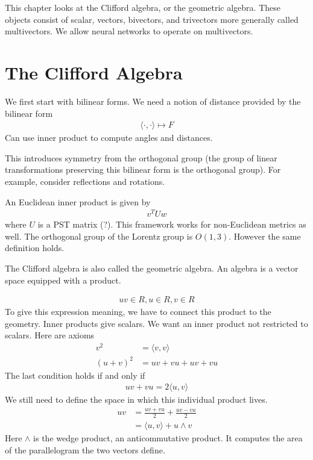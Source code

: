 \documentclass[book.tex]{subfiles}
\begin{document}
This chapter looks at the Clifford algebra, or the geometric algebra. These objects consist of scalar, vectors, bivectors, and trivectors more generally called multivectors. We allow neural networks to operate on multivectors.

\section{The Clifford Algebra}

We first start with bilinear forms. We need a notion of distance provided by the bilinear form
\begin{align}
    \langle \cdot, \cdot \rangle \mapsto F
\end{align}
Can use inner product to compute angles and distances.

This introduces symmetry from the orthogonal group (the group of linear transformations preserving this bilinear form is the orthogonal group). For example, consider reflections and rotations. 

An Euclidean inner product is given by
\begin{align}
    v^TUw
\end{align}
where $U$ is a PST matrix (?). This framework works for non-Euclidean metrics as well. The orthogonal group of the Lorentz group is $O(1, 3)$. However the same definition holds.

The Clifford algebra is also called the geometric algebra. An algebra is a vector space equipped with a product. 

\begin{align}
    uv \in R, u \in R, v \in R
\end{align}
To give this expression meaning, we have to connect this product to the geometry. Inner products give scalars. We want an inner product not restricted to scalars. Here are axioms
\begin{align}
    v^2 &= \langle v, v \rangle \\
    (u + v)^2 &= uv + vu + uv + vu 
\end{align}
The last condition holds if and only if
\begin{align}
    uv + vu = 2\langle u, v\rangle
\end{align}
We still need to define the space in which this individual product lives.
\begin{align}
    uv &= \frac{uv + vu}{2} + \frac{uv-vu}{2}  \\
    &= \langle u, v \rangle + u \wedge v
\end{align}
Here $\wedge$ is the wedge product, an anticommutative product. It computes the area of the parallelogram the two vectors define.
\end{document}
